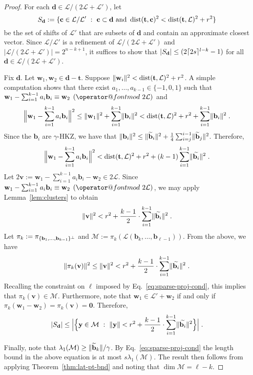 \documentclass[11pt]{article}
\makeatletter
\renewcommand{\vec}[1]{\ensuremath{\mathbf{#1}}}
\newcommand{\M}{\mathcal{M}}
\def\imod#1{\allowbreak\mkern8mu({\operator@font mod}\,\,#1)}
\newcommand{\lat}{\mathcal{L}}
\newcommand{\gs}[1]{\ensuremath{\widetilde{#1}}}
\DeclareMathOperator{\dist}{dist}
\DeclarePairedDelimiter\set{\{}{\}}
\DeclarePairedDelimiter\ceil{\lceil}{\rceil}
\DeclarePairedDelimiter\length{\lVert}{\rVert}
\makeatother
\begin{document}
\begin{proof}
For each $\vec{d} \in \lat/(2\lat + \lat')$, let 
\[
S_{\vec{d}} := \set{\vec{c} \in \lat/\lat'\ :\ \vec{c} \subset \vec{d} \text{ and } \dist(\vec{t}, \vec{c})^2 < \dist(\vec{t}, \lat)^2 + r^2}
\]
be the set of shifts of $\lat'$ that are subsets of $\vec{d}$ and contain an approximate closest vector. Since $\lat/\lat'$ is a refinement of $\lat/(2\lat + \lat')$ and $|\lat/(2\lat + \lat')| = 2^{n-k+1}$, it suffices to show that $|S_{\vec{d}}| \leq (2\ceil{2s}^{l-k}-1)$ for all $\vec{d} \in \lat/(2\lat + \lat')$.

Fix $\vec{d}$. Let $\vec{w}_1, \vec{w}_2 \in \vec{d} - \vec{t}$. Suppose $\length{\vec{w}_i}^2 < \dist(\vec{t}, \lat)^2 + r^2$.
A simple computation shows that there exist $a_1,\ldots, a_{k-1} \in \{-1,0,1\}$ such that $\vec{w}_1 - \sum_{i=1}^{k-1} a_i \vec{b}_i \equiv \vec{w}_2 \imod{2\lat}$ and
\[
\Big\| \vec{w}_1 - \sum_{i=1}^{k-1} a_i \vec{b}_i \Big\|^2 \leq \length{\vec{w}_1}^2 + \sum_{i=1}^{k-1} \length{\vec{b}_i}^2 < \dist(\vec{t}, \lat)^2 + r^2 + \sum_{i=1}^{k-1} \length{\vec{b}_i}^2 
\;.
\]
Since the $\vec{b}_i$ are $\gamma$-HKZ, we have that $\length{\vec{b}_i}^2 \leq \length{\gs{\vec{b}}_i}^2 + \frac{1}{4} \sum_{i=j}^{i-1}\length{\gs{\vec{b}}_j}^2$. Therefore, 
\[
\Big\| \vec{w}_1 - \sum_{i=1}^{k-1} a_i \vec{b}_i \Big\|^2 < \dist(\vec{t}, \lat)^2 + r^2  + (k-1)\sum_{i=1}^{k-1} \length{\gs{\vec{b}_i}}^2
\; .
\]
Let $2\vec{v} := \vec{w}_1 - \sum_{i=1}^{k-1} a_i \vec{b}_i - \vec{w}_2 \in 2\lat$. Since $\vec{w}_1 - \sum_{i=1}^{k-1} a_i \vec{b}_i \equiv \vec{w}_2 \imod{2\lat}$, we may apply Lemma~\ref{lem:clusters} to obtain
\[
\length{\vec{v}}^2 < r^2 + \frac{k-1}{2} \cdot \sum_{i=1}^{k-1} \length{\gs{\vec{b}_i}}^2 \; .
\]
Let $\pi_k := \pi_{\set{\vec{b}_1,\ldots, \vec{b}_{k-1}}^\perp}$ and $\M := \pi_k(\lat(\vec{b}_k,\ldots, \vec{b}_{\ell-1}))$. From the above, we have
\[
\length{\pi_k(\vec{v})}^2 \le \length{\vec{v}}^2 < r^2 + \frac{k-1}{2} \cdot \sum_{i=1}^{k-1} \length{\gs{\vec{b}_i}}^2
\; .
\]
Recalling the constraint on $\ell$ imposed by Eq.~\eqref{eq:sparse-proj-cond}, this implies that $\pi_k(\vec{v}) \in \M$. Furthermore, note that $\vec{w}_1 \in \lat' + \vec{w}_2$ if and only if $\pi_k(\vec{w}_1 - \vec{w}_2) = \pi_k(\vec{v}) = \vec0$. Therefore,
\[
|S_{\vec{d}}| \leq \Big| \Big\{ \vec{y} \in \M\ :\ \length{\vec{y}} < r^2 + \frac{k-1}{2} \cdot \sum_{i=1}^{k-1} \length{\gs{\vec{b}_i}}^2 \Big\} \Big|
\; .
\]

Finally, note that $\lambda_1(\M) \geq \length{\gs{\vec{b}}_k}/\gamma$. By Eq.~\eqref{eq:sparse-proj-cond} the length bound in the above equation is at most $s \lambda_1(\M)$. The result then follows from applying Theorem~\ref{thm:lat-pt-bnd} and noting that $\dim \M = \ell - k$.
\end{proof}
\end{document}
